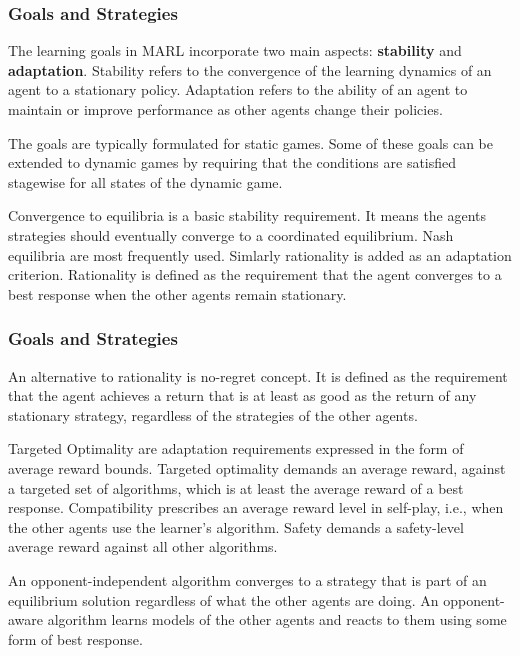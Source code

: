 \documentclass{beamer}
\begin{document}
\begin{frame}
\frametitle{Goals and Strategies}
The learning goals in MARL incorporate two main aspects: \textbf{stability} and \textbf{adaptation}.
Stability refers to the convergence of the learning dynamics of an agent to a stationary policy.
Adaptation refers to the ability of an agent to maintain or improve performance as other agents change their policies.
\vspace{10pt}

The goals are typically formulated for static games. Some of these goals can be extended to dynamic games by requiring that the conditions are satisfied stagewise for all states of the dynamic game.
\vspace{10pt}

Convergence to equilibria is a basic stability requirement. It means the agents strategies should eventually converge to a coordinated equilibrium. Nash equilibria are most frequently used. Simlarly rationality is added as an adaptation criterion. Rationality is defined as the requirement that the agent converges to a best response when the other agents remain stationary.
\end{frame}

\begin{frame}
\frametitle{Goals and Strategies}



An alternative to rationality is no-regret concept. It is defined as the requirement that the agent achieves a return that is at least as good as the return of any stationary strategy, regardless of the strategies of the other agents.
\vspace{10pt}

Targeted Optimality are adaptation requirements expressed in the form of average reward bounds. Targeted optimality demands an average reward, against a targeted set of algorithms, which is at least the average reward of a best response. Compatibility prescribes an average reward level in self-play, i.e., when the other agents use the learner’s algorithm. Safety demands a safety-level average reward against all other algorithms.
\vspace{10pt}

An opponent-independent algorithm converges to a strategy that is part of an equilibrium solution regardless of what the other agents are doing. An opponent-aware algorithm learns models of the other agents and reacts to them using some form of best response.
\end{frame}
\end{document}
